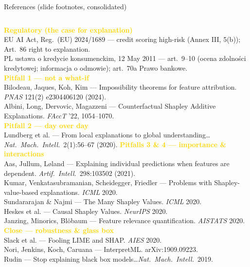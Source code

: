 \documentclass[aspectratio=169,11pt]{beamer}
\begin{document}
\begin{frame}{References (slide footnotes, consolidated)}
\scriptsize
\begin{columns}[T]
\textbf{\textcolor{gold}{Regulatory (the case for explanation)}}\\
EU AI Act, Reg.\ (EU) 2024/1689 --- credit scoring high-risk (Annex III, 5(b)); Art.\ 86 right to explanation.\\
PL ustawa o kredycie konsumenckim, 12 May 2011 --- art.\ 9--10 (ocena zdolno\'sci kredytowej; informacja o odmowie); art.\ 70a Prawo bankowe.\\[4pt]
\textbf{\textcolor{gold}{Pitfall 1 --- not a what-if}}\\
Bilodeau, Jaques, Koh, Kim --- Impossibility theorems for feature attribution. \emph{PNAS} 121(2) e2304406120 (2024).\\
Albini, Long, Dervovic, Magazzeni --- Counterfactual Shapley Additive Explanations. \emph{FAccT} '22, 1054--1070.\\[4pt]
\textbf{\textcolor{gold}{Pitfall 2 --- day over day}}\\
Lundberg et al. --- From local explanations to global understanding\dots \emph{Nat.\ Mach.\ Intell.}\ 2(1):56--67 (2020).
\textbf{\textcolor{gold}{Pitfalls 3 \& 4 --- importance \& interactions}}\\
Aas, Jullum, L\o land --- Explaining individual predictions when features are dependent. \emph{Artif.\ Intell.}\ 298:103502 (2021).\\
Kumar, Venkatasubramanian, Scheidegger, Friedler --- Problems with Shapley-value-based explanations. \emph{ICML} 2020.\\
Sundararajan \& Najmi --- The Many Shapley Values. \emph{ICML} 2020.\\
Heskes et al. --- Causal Shapley Values. \emph{NeurIPS} 2020.\\
Janzing, Minorics, Bl\"obaum --- Feature relevance quantification. \emph{AISTATS} 2020.\\[4pt]
\textbf{\textcolor{gold}{Close --- robustness \& glass box}}\\
Slack et al. --- Fooling LIME and SHAP. \emph{AIES} 2020.\\
Nori, Jenkins, Koch, Caruana --- InterpretML. arXiv:1909.09223.\\
Rudin --- Stop explaining black box models\dots \emph{Nat.\ Mach.\ Intell.}\ 2019.
\end{columns}
\end{frame}
\end{document}
